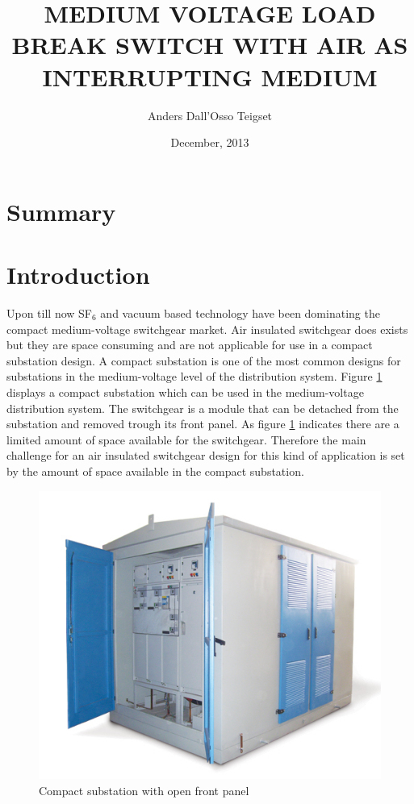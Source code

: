 \documentclass[10pt,a4paper]{article}
\author{Anders Dall'Osso Teigset}
\title{MEDIUM VOLTAGE LOAD BREAK SWITCH WITH AIR AS INTERRUPTING MEDIUM}
\date{December, 2013}
\begin{document}
\maketitle
\newpage

\section*{Summary}

\newpage
\tableofcontents
\newpage

\section{Introduction}
Upon till now SF$_6$ and vacuum based technology have been dominating the compact medium-voltage switchgear market. Air insulated switchgear does exists but they are space consuming and are not applicable for use in a compact substation design. A compact substation is one of the most common designs for substations in the medium-voltage level of the distribution system. Figure \ref{fig:compact substation} displays a compact substation which can be used in the medium-voltage distribution system. The switchgear is a module that can be detached from the substation and removed trough its front panel. As figure \ref{fig:compact substation} indicates there are a limited amount of space available for the switchgear. Therefore the main challenge for an air insulated switchgear design for this kind of application is set by the amount of space available in the compact substation.

\begin{figure} [h]
\centering
\includegraphics[scale=0.5]{Bilder/Introduction/general_substation.jpg}
\caption{Compact substation with open front panel \cite{bib:comSub}} \label{fig:compact substation}
\end{figure}
\end{document}
